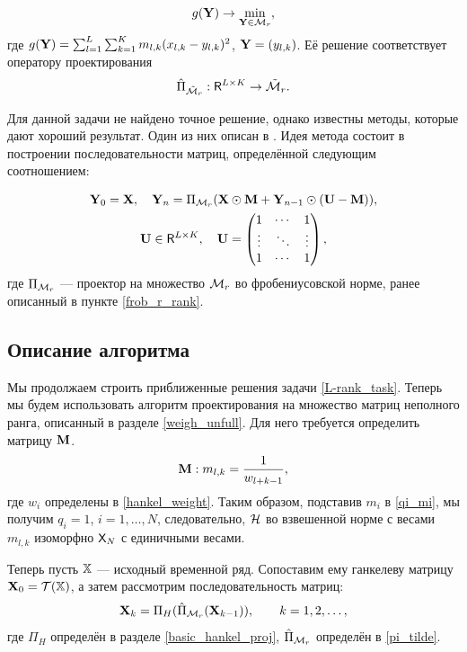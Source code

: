 \documentclass[12pt,a4paper,fleqn,leqno]{article}
\begin{document}
\begin{equation*}
g(\mathbf{Y}) \to \min_{\mathbf{Y} \in \mathcal{M}_r},
\end{equation*}
где $g(\mathbf{Y}) = \sum_{l = 1}^L \sum_{k = 1}^K m_{l,k}(x_{l, k} - y_{l, k})^2$, $\mathbf{Y} = (y_{l,k})$. Её решение соответствует оператору проектирования
\begin{equation}\label{pi_tilde}
\hat\Pi_{\tilde {\mathcal{M}}_r} : \mathsf{R}^{L \times K} \to \tilde{\mathcal{M}}_r.
\end{equation}

Для данной задачи не найдено точное решение, однако известны методы, которые дают хороший результат. Один из них описан в \cite{Srebro2003}. Идея метода состоит в построении последовательности матриц, определённой следующим соотношением:

\begin{gather*}
\mathbf{Y}_0 = \mathbf{X}, \quad \mathbf{Y}_n = \Pi_{\mathcal{M}_r}(\mathbf{X} \odot \mathbf{M} + \mathbf{Y}_{n - 1} \odot (\mathbf{U} -  \mathbf{M})), \\
\mathbf{U} \in \mathsf{R}^{L \times K}, \quad \mathbf{U} = \begin{pmatrix}
1 & \cdots & 1 \\
\vdots & \ddots & \vdots \\
1 & \cdots & 1
\end{pmatrix} ,
\end{gather*}
где $\Pi_{\mathcal{M}_r}$ --- проектор на множество $\mathcal{M}_r$ во фробениусовской норме, ранее описанный в пункте \ref{frob_r_rank}.

\subsection{Описание алгоритма}
Мы продолжаем строить приближенные решения задачи \eqref{L-rank_task}. Теперь мы будем использовать алгоритм проектирования на множество матриц неполного ранга, описанный в разделе \ref{weigh_unfull}. Для него требуется определить матрицу $\mathbf{M}$.
\begin{equation} \label{Mw}
\mathbf{M}: m_{l, k} = \frac{1}{w_{l + k - 1}},
\end{equation}
где $w_i$ определены в \eqref{hankel_weight}. Таким образом, подставив $m_i$ в \eqref{qi_mi}, мы получим $q_i = 1$, $i = 1, \ldots, N$, следовательно, $\mathcal{H}$ во взвешенной норме с весами $m_{l, k}$ изоморфно $\mathsf{X}_N$ с единичными весами.

Теперь пусть $\mathbb{X}$ --- исходный временной ряд. Сопоставим ему ганкелеву матрицу $\mathbf{X}_0 = \mathcal{T}(\mathbb{X})$, а затем рассмотрим последовательность матриц:
\begin{equation*}
\mathbf{X}_k = \Pi_H (\hat \Pi_{\mathcal{M}_r} (\mathbf{X}_{k-1})), \qquad k = 1, 2, \ldots,
\end{equation*}
где $\Pi_H$ определён в разделе \ref{basic_hankel_proj}, $\hat \Pi_{\mathcal{M}_r}$ определён в \eqref{pi_tilde}.
\end{document}
